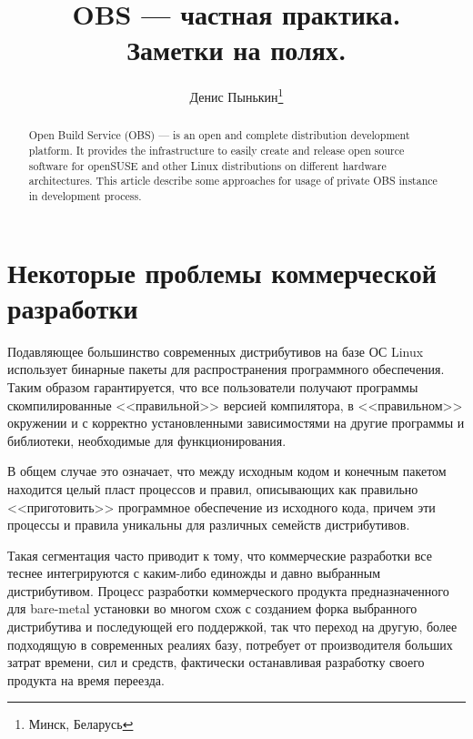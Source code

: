 \documentclass[10pt, a5paper]{article}
\begin{document}
\title{OBS --- частная практика.\\Заметки на полях.}

\author{Денис Пынькин\footnote{Минск, Беларусь}}
\maketitle

\begin{abstract}
Open Build Service (OBS) --- is an open and complete distribution development platform. It provides the infrastructure to easily create and release open source software for openSUSE and other Linux distributions on different hardware architectures. This article describe some approaches for usage of private OBS instance in development process.
\end{abstract}

\section*{Некоторые проблемы коммерческой разработки}

Подавляющее большинство современных дистрибутивов на базе ОС Linux использует бинарные пакеты для распространения программного обеспечения. Таким образом гарантируется, что все пользователи получают программы скомпилированные <<правильной>> версией компилятора, в <<правильном>> окружении и с корректно установленными зависимостями на другие программы и библиотеки, необходимые для функционирования.

В общем случае это означает, что между исходным кодом и конечным пакетом находится целый пласт процессов и правил, описывающих как правильно <<приготовить>> программное обеспечение из исходного кода, причем эти процессы и правила уникальны для различных семейств дистрибутивов.

Такая сегментация часто приводит к тому, что коммерческие разработки все теснее интегрируются с каким-либо единожды и давно выбранным дистрибутивом. Процесс разработки коммерческого продукта предназначенного для bare-metal установки во многом схож с созданием форка выбранного дистрибутива и последующей его поддержкой, так что переход на другую, более подходящую в современных реалиях базу, потребует от производителя больших затрат времени, сил и средств, фактически останавливая разработку своего продукта на время переезда.
\end{document}
